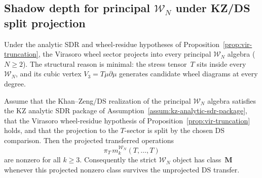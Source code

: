 \subsection{Shadow depth for principal
\texorpdfstring{$\mathcal{W}_N$}{W\_N} under KZ/DS split projection}
\label{subsec:wn-class-M}

Under the analytic SDR and wheel-residue hypotheses of
Proposition~\ref{prop:vir-truncation}, the Virasoro wheel sector
projects into every principal $\mathcal{W}_N$ algebra ($N \ge 2$).
The structural reason is minimal: the stress tensor~$T$ sits inside
every $\mathcal{W}_N$, and its cubic vertex
$V_3 = T\mu\partial\mu$ generates candidate wheel diagrams at every
degree.

\begin{theorem}
\label{thm:wn-class-M-stable}
%
%
Assume that the Khan--Zeng/DS realization of the principal
$\mathcal{W}_N$ algebra satisfies the KZ analytic SDR package of
Assumption~\textup{\ref{assum:kz-analytic-sdr-package}}, that the
Virasoro wheel-residue hypothesis of
Proposition~\textup{\ref{prop:vir-truncation}} holds, and that the
projection to the $T$-sector is split by the chosen DS comparison.
Then the projected transferred operations
\[
 \pi_T\,m_k^{\mathcal W_N}(T,\ldots,T)
\]
are nonzero for all $k\ge 3$. Consequently the strict
$\mathcal W_N$ object has class~$\mathbf M$ whenever this projected
nonzero class survives the unprojected DS transfer.
\end{theorem}

